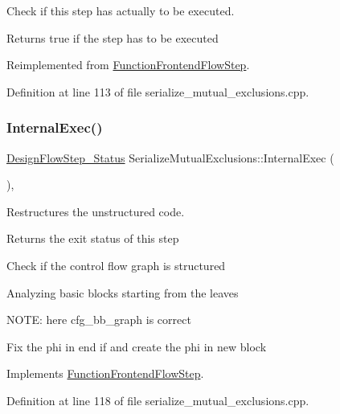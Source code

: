 Check if this step has actually to be executed. 

\begin{DoxyReturn}{Returns}
true if the step has to be executed 
\end{DoxyReturn}


Reimplemented from \hyperlink{classFunctionFrontendFlowStep_a12e786363530aa9533e4bd9380130d75}{Function\+Frontend\+Flow\+Step}.



Definition at line 113 of file serialize\+\_\+mutual\+\_\+exclusions.\+cpp.

\mbox{\label{classSerializeMutualExclusions_a7b0969d1c788283b2c103a5b64d44cca}} 
\subsubsection{\texorpdfstring{Internal\+Exec()}{InternalExec()}}
{\footnotesize\ttfamily \hyperlink{design__flow__step_8hpp_afb1f0d73069c26076b8d31dbc8ebecdf}{Design\+Flow\+Step\+\_\+\+Status} Serialize\+Mutual\+Exclusions\+::\+Internal\+Exec (\begin{DoxyParamCaption}{ }\end{DoxyParamCaption})\hspace{0.3cm}{\ttfamily [override]}, {\ttfamily [virtual]}}



Restructures the unstructured code. 

\begin{DoxyReturn}{Returns}
the exit status of this step 
\end{DoxyReturn}
Check if the control flow graph is structured

Analyzing basic blocks starting from the leaves

N\+O\+TE\+: here cfg\+\_\+bb\+\_\+graph is correct

Fix the phi in end if and create the phi in new block 

Implements \hyperlink{classFunctionFrontendFlowStep_a00612f7fb9eabbbc8ee7e39d34e5ac68}{Function\+Frontend\+Flow\+Step}.



Definition at line 118 of file serialize\+\_\+mutual\+\_\+exclusions.\+cpp.



